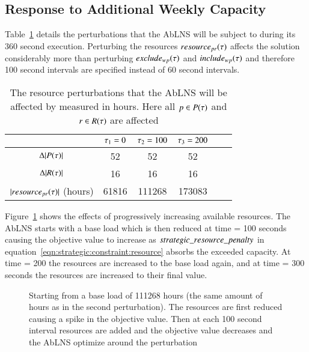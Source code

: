 \subsection{Response to Additional Weekly Capacity}\label{sec:increase_week_cap}
Table~\ref{tab:responses:resource-addition} details the perturbations that the
AbLNS will be subject to during its 360 second execution. Perturbing the
resources $\ParStrategicResource$ affects the solution considerably more than
perturbing $exclude_{wp}(\tau)$ and $include_{wp}(\tau)$ and therefore 100
second intervals are specified instead of 60 second intervals.

\begin{table}[H]
	\centering
	\begin{tabular}{cccccc}
	\toprule
	                                     & $\tau_1 = 0$ & $\tau_2 = 100$ & $\tau_3 = 200$   \\ \midrule
	$\Delta |P(\tau)|$                & 52                     & 52                     & 52                     \\ \midrule
	$\Delta |R(\tau)|$              & 16                     & 16                     & 16                     \\ \midrule
	$ |resource_{pr}(\tau)|$ (hours) &  61816                 & 111268                 & 173083                 \\ \bottomrule
	\end{tabular}
	\caption{The resource perturbations that the AbLNS will be affected by measured in hours. Here all $p \in P(\tau)$ and $r \in R(\tau)$ are 
		affected
	}\label{tab:responses:resource-addition}
\end{table}

Figure~\ref{fig:responses:resources-addition} shows the effects of progressively
increasing  available resources. The AbLNS starts with a base load which is
then reduced at time = 100 seconds causing the objective value to increase
as $strategic\_resource\_penalty$ in equation~\ref{eqn:strategic:constraint:resource}
absorbs the exceeded capacity. At time = 200 the resources are increased to the
base load again, and at time = 300 seconds the resources are increased to their
final value.

\begin{figure}[H]%
	\centering
	\resizebox{10cm}{!}{
		
	}
	\caption{Starting from a base load of 111268 hours (the same amount of 
		hours as in the second perturbation). The resources are first reduced
		causing a spike in the objective value. Then at each 100 second interval
		resources are added and the objective value decreases and the AbLNS 
		optimize around the perturbation
	}\label{fig:responses:resources-addition}
\end{figure}

